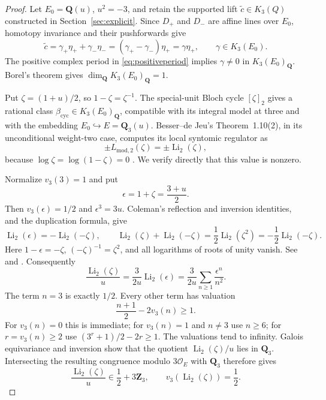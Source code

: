 \documentclass[11pt,a4paper]{article}
\theoremstyle{remark}
\newcommand{\Q}{\mathbf Q}
\newcommand{\Z}{\mathbf Z}
\newcommand{\OO}{\mathcal O}
\begin{document}
\begin{proof}
Let $E_0=\Q(u)$, $u^2=-3$, and retain the supported lift $\widetilde c\in K_3(Q)$ constructed in Section~\ref{sec:explicit}. Since $D_+$ and $D_-$ are affine lines over $E_0$, homotopy invariance and their pushforwards give
\[
\widetilde c=\gamma_+\eta_++\gamma_-\eta_-
=(\gamma_+-\gamma_-)\eta_+=\gamma\eta_+,
\qquad \gamma\in K_3(E_0).
\]
The positive complex period in \eqref{eq:positiveperiod} implies $\gamma\ne0$ in $K_3(E_0)_{\Q}$. Borel's theorem gives $\dim_{\Q}K_3(E_0)_{\Q}=1$.

Put $\zeta=(1+u)/2$, so $1-\zeta=\zeta^{-1}$. The special-unit Bloch cycle $[\zeta]_2$ gives a rational class $\beta_{\mathrm{cyc}}\in K_3(E_0)_{\Q}$, compatible with its integral model at three and with the embedding $E_0\hookrightarrow E=\Q_3(u)$. Besser--de Jeu's Theorem~1.10(2), in its unconditional weight-two case, computes its local syntomic regulator as
\[
\pm L_{\mathrm{mod},2}(\zeta)=\pm\operatorname{Li}_2(\zeta),
\]
because $\log\zeta=\log(1-\zeta)=0$ \cite{BesserDeJeu}. We verify directly that this value is nonzero.

Normalize $v_3(3)=1$ and put
\[
 \epsilon=1+\zeta=\frac{3+u}{2}.
\]
Then $v_3(\epsilon)=1/2$ and $\epsilon^3=3u$.
Coleman's reflection and inversion identities, and the duplication
formula, give
\[
 \operatorname{Li}_2(\epsilon)
 =-\operatorname{Li}_2(-\zeta),\qquad
 \operatorname{Li}_2(\zeta)+\operatorname{Li}_2(-\zeta)
 =\frac12\operatorname{Li}_2(\zeta^2)
 =-\frac12\operatorname{Li}_2(-\zeta).
\]
Here $1-\epsilon=-\zeta$, $( -\zeta)^{-1}=\zeta^2$,
and all logarithms of roots of unity vanish. See
\cite[equation~(1.2) and (2.4)]{BesserDeJeu}
and \cite[p.~377]{BesserDeJeuCurves}.
Consequently
\[
 \frac{\operatorname{Li}_2(\zeta)}u
 =\frac{3}{2u}\operatorname{Li}_2(\epsilon)
 =\frac{3}{2u}\sum_{n\geq1}\frac{\epsilon^n}{n^2}.
\]
The term $n=3$ is exactly $1/2$. Every other term has valuation
\[
 \frac{n+1}{2}-2v_3(n)\geq1.
\]
For $v_3(n)=0$ this is immediate; for $v_3(n)=1$ and $n\ne3$
use $n\geq6$; for $r=v_3(n)\geq2$ use
$(3^r+1)/2-2r\geq1$. The valuations tend to infinity.
Galois equivariance and inversion show that the quotient
$\operatorname{Li}_2(\zeta)/u$ lies in $\Q_3$.
Intersecting the resulting congruence modulo $3\OO_E$ with
$\Q_3$ therefore gives
\begin{equation}\label{eq:localdilog}
\boxed{\quad
\frac{\operatorname{Li}_2(\zeta)}u\in\frac12+3\Z_3,
\qquad v_3(\operatorname{Li}_2(\zeta))=\frac12.
\quad}
\end{equation}


\end{proof}
\end{document}
